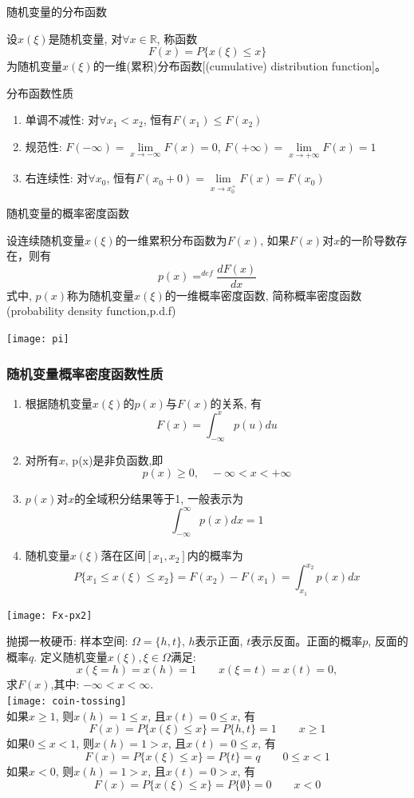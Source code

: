 \begin{frame}{随机变量的分布函数}
\begin{definition}
	设$x(\xi)$是随机变量, 对$\forall x\in\mathbb{R}$, 称函数
	\[F(x)=P\{x(\xi)\le x\}\]
	为随机变量$x(\xi)$的一维(累积)分布函数[(cumulative) distribution function]。
\end{definition}
\begin{block}{分布函数性质}
\begin{enumerate}
	\item 单调不减性: 对$\forall x_1<x_2$, 恒有$F(x_1)\le F(x_2)$
	\item 规范性: $F(-\infty)=\lim\limits_{x\to -\infty}F(x)=0$, $F(+\infty)=\lim\limits_{x\to +\infty}F(x)=1$
	\item 右连续性: 对$\forall x_0$, 恒有$F(x_0+0)=\lim\limits_{x\to x_0^+}F(x)=F(x_0)$
\end{enumerate}
\end{block}
\end{frame}

\begin{frame}{随机变量的概率密度函数}
\begin{definition}
	设连续随机变量$x(\xi)$的一维累积分布函数为$F(x)$, 如果$F(x)$对$x$的一阶导数存在，则有
	\[p(x)\mathop{=}^{def}\frac{dF(x)}{dx}\]
	式中, $p(x)$称为随机变量$x(\xi)$的一维概率密度函数, 简称概率密度函数(probability density function,p.d.f)
\end{definition}
\texttt{[image: pi]}
\end{frame}

\begin{frame}[shrink]
\frametitle{随机变量概率密度函数性质}
\begin{enumerate}
	\item 根据随机变量$x(\xi)$的$p(x)$与$F(x)$的关系, 有
	\[F(x)=\int_{-\infty}^{x}p(u)du\]
	\item 对所有$x$, p(x)是非负函数,即
	\[p(x)\ge 0,\quad -\infty<x<+\infty \]
	\item $p(x)$对$x$的全域积分结果等于1, 一般表示为
	\[\int_{-\infty}^{\infty}p(x)dx=1\]
	\item 随机变量$x(\xi)$落在区间$[x_1,x_2]$内的概率为
	\[P\{x_1\le x(\xi)\le x_2\}=F(x_2)-F(x_1)=\int_{x_1}^{x_2}p(x)dx\]
\end{enumerate}
\texttt{[image: Fx-px2]}
\end{frame}

\begin{frame}[shrink]
抛掷一枚硬币: 样本空间: $\Omega=\{h,t\}$, $h$表示正面, $t$表示反面。正面的概率$p$, 反面的概率$q$. 定义随机变量$x(\xi),\xi\in \Omega$满足:
	\[x(\xi=h)=x(h)=1\qquad x(\xi=t)=x(t)=0,\]
	求$F(x)$,其中: $-\infty<x<\infty$.\\
	\texttt{[image: coin-tossing]}\\
	如果$x\ge 1$, 则$x(h)=1\le x$, 且$x(t)=0\le x$, 有
	\[F(x)=P\{x(\xi)\le x \}=P\{h,t\}=1\qquad x\ge 1 \] 
    如果$0\le x<1$, 则$x(h)=1> x$, 且$x(t)=0\le x$, 有
    \[F(x)=P\{x(\xi)\le x \}=P\{t\}=q \qquad 0\le x<1 \] 
    如果$x<0$, 则$x(h)=1> x$, 且$x(t)=0> x$, 有
    \[F(x)=P\{x(\xi)\le x \}=P\{\emptyset\}=0 \qquad x<0 \] 
\end{frame}

